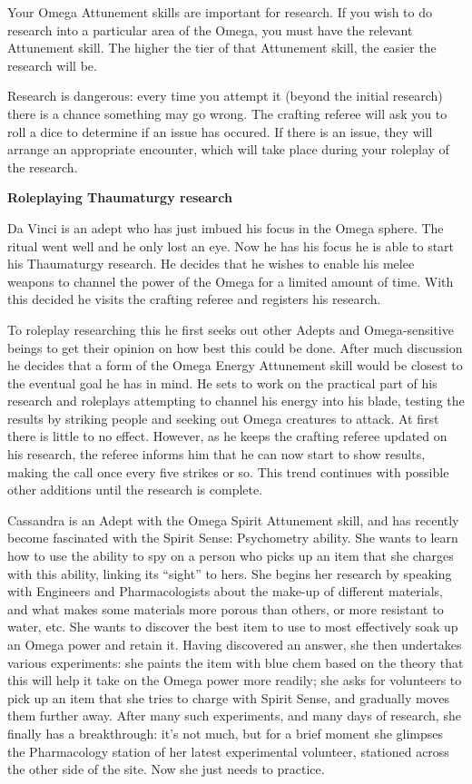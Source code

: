 Your Omega Attunement skills are important for research. If you wish to do research into a particular area of the Omega, you must have the relevant Attunement skill. The higher the tier of that Attunement skill, the easier the research will be.

Research is dangerous: every time you attempt it (beyond the initial research) there is a chance something may go wrong. The crafting referee will ask you to roll a dice to determine if an issue has occured. If there is an issue, they will arrange an appropriate encounter, which will take place during your roleplay of the research.

\textbf{Roleplaying Thaumaturgy research}

Da Vinci is an adept who has just imbued his focus in the Omega sphere. The ritual went well and he only lost an eye. Now he has his focus he is able to start his Thaumaturgy research. He decides that he wishes to enable his melee weapons to channel the power of the Omega for a limited amount of time. With this decided he visits the crafting referee and registers his research.

To roleplay researching this he first seeks out other Adepts and Omega-sensitive beings to get their opinion on how best this could be done. After much discussion he decides that a form of the Omega Energy Attunement skill would be closest to the eventual goal he has in mind. He sets to work on the practical part of his research and roleplays attempting to channel his energy into his blade, testing the results by striking people and seeking out Omega creatures to attack. At first there is little to no effect. However, as he keeps the crafting referee updated on his research, the referee informs him that he can now start to show results, making the call once every five strikes or so. This trend continues with possible other additions until the research is complete.

Cassandra is an Adept with the Omega Spirit Attunement skill, and has recently become fascinated with the Spirit Sense: Psychometry ability. She wants to learn how to use the ability to spy on a person who picks up an item that she charges with this ability, linking its ``sight'' to hers. She begins her research by speaking with Engineers and Pharmacologists about the make-up of different materials, and what makes some materials more porous than others, or more resistant to water, etc. She wants to discover the best item to use to most effectively soak up an Omega power and retain it. Having discovered an answer, she then undertakes various experiments: she paints the item with blue chem based on the theory that this will help it take on the Omega power more readily; she asks for volunteers to pick up an item that she tries to charge with Spirit Sense, and gradually moves them further away. After many such experiments, and many days of research, she finally has a breakthrough: it's not much, but for a brief moment she glimpses the Pharmacology station of her latest experimental volunteer, stationed across the other side of the site. Now she just needs to practice.

